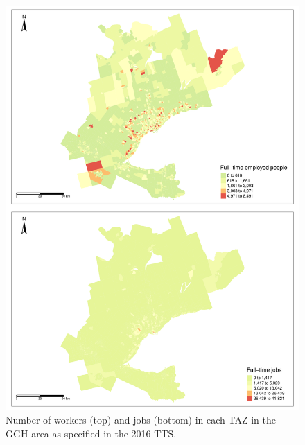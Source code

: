 \documentclass[Royal,times,sageh]{sagej}
\begin{document}
\begin{figure}
\includegraphics[width=1\linewidth]{Manuscript-Data-Package_files/figure-latex/tts-workers-jobs-plot-1} \caption{\label{fig:tts-workers-jobs-plot}Number of workers (top) and jobs (bottom) in each TAZ in the GGH area as specified in the 2016 TTS.}\label{fig:tts-workers-jobs-plot}
\end{figure}
\end{document}

